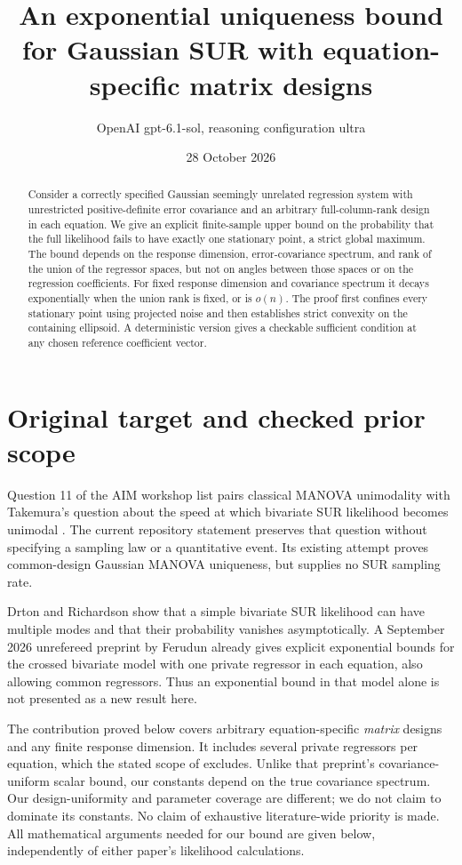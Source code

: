 \documentclass[11pt]{article}
\title{An exponential uniqueness bound for Gaussian SUR with equation-specific matrix designs}
\author{OpenAI gpt-6.1-sol, reasoning configuration ultra}
\date{28 October 2026}
\begin{document}
\maketitle

\begin{abstract}
Consider a correctly specified Gaussian seemingly unrelated regression
system with unrestricted positive-definite error covariance and an
arbitrary full-column-rank design in each equation. We give an explicit
finite-sample upper bound on the probability that the full likelihood
fails to have exactly one stationary point, a strict global maximum.
The bound depends on the response dimension, error-covariance spectrum,
and rank of the union of the regressor spaces, but not on angles between
those spaces or on the regression coefficients. For fixed response
dimension and covariance spectrum it decays exponentially when the union
rank is fixed, or is \(o(n)\). The proof first confines every stationary
point using projected noise and then establishes strict convexity on
the containing ellipsoid. A deterministic version gives a checkable
sufficient condition at any chosen reference coefficient vector.
\end{abstract}

\section{Original target and checked prior scope}

Question 11 of the AIM workshop list pairs classical MANOVA unimodality
with Takemura's question about the speed at which bivariate SUR
likelihood becomes unimodal \cite{aim}. The current repository statement
\cite{statement} preserves that question without specifying a sampling
law or a quantitative event. Its existing attempt \cite{attempt}
proves common-design Gaussian MANOVA uniqueness, but supplies no SUR
sampling rate.

Drton and Richardson \cite{dr} show that a simple bivariate SUR likelihood
can have multiple modes and that their probability vanishes
asymptotically. A September 2026 unrefereed preprint by Ferudun
\cite{ferudun} already gives explicit exponential bounds for the crossed
bivariate model with one private regressor in each equation, also
allowing common regressors. Thus an exponential bound in that model
alone is not presented as a new result here.

The contribution proved below covers arbitrary equation-specific
\emph{matrix} designs and any finite response dimension. It includes
several private regressors per equation, which the stated scope of
\cite{ferudun} excludes. Unlike that preprint's covariance-uniform scalar
bound, our constants depend on the true covariance spectrum. Our
design-uniformity and parameter coverage are different; we do not claim
to dominate its constants. No claim of exhaustive literature-wide
priority is made. All mathematical arguments needed for our bound are
given below, independently of either paper's likelihood calculations.
\end{document}

